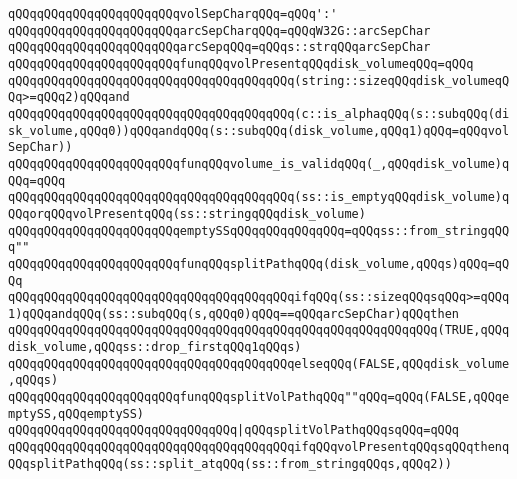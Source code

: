 \verb|qQQqqQQqqQQqqQQqqQQqqQQqvolSepCharqQQq=qQQq':'|\newline
\newline
\verb|qQQqqQQqqQQqqQQqqQQqqQQqarcSepCharqQQq=qQQqW32G::arcSepChar|\newline
\verb|qQQqqQQqqQQqqQQqqQQqqQQqarcSepqQQq=qQQqs::strqQQqarcSepChar|\newline
\newline
\verb|qQQqqQQqqQQqqQQqqQQqqQQqfunqQQqvolPresentqQQqdisk_volumeqQQq=qQQq|\newline
\verb|qQQqqQQqqQQqqQQqqQQqqQQqqQQqqQQqqQQqqQQq(string::sizeqQQqdisk_volumeqQQq>=qQQq2)qQQqand|\newline
\verb|qQQqqQQqqQQqqQQqqQQqqQQqqQQqqQQqqQQqqQQq(c::is_alphaqQQq(s::subqQQq(disk_volume,qQQq0))qQQqandqQQq(s::subqQQq(disk_volume,qQQq1)qQQq=qQQqvolSepChar))|\newline
\newline
\verb|qQQqqQQqqQQqqQQqqQQqqQQqfunqQQqvolume_is_validqQQq(_,qQQqdisk_volume)qQQq=qQQq|\newline
\verb|qQQqqQQqqQQqqQQqqQQqqQQqqQQqqQQqqQQqqQQq(ss::is_emptyqQQqdisk_volume)qQQqorqQQqvolPresentqQQq(ss::stringqQQqdisk_volume)|\newline
\newline
\verb|qQQqqQQqqQQqqQQqqQQqqQQqemptySSqQQqqQQqqQQqqQQq=qQQqss::from_stringqQQq""|\newline
\newline
\verb|qQQqqQQqqQQqqQQqqQQqqQQqfunqQQqsplitPathqQQq(disk_volume,qQQqs)qQQq=qQQq|\newline
\verb|qQQqqQQqqQQqqQQqqQQqqQQqqQQqqQQqqQQqqQQqifqQQq(ss::sizeqQQqsqQQq>=qQQq1)qQQqandqQQq(ss::subqQQq(s,qQQq0)qQQq==qQQqarcSepChar)qQQqthen|\newline
\verb|qQQqqQQqqQQqqQQqqQQqqQQqqQQqqQQqqQQqqQQqqQQqqQQqqQQqqQQqqQQq(TRUE,qQQqdisk_volume,qQQqss::drop_firstqQQq1qQQqs)|\newline
\verb|qQQqqQQqqQQqqQQqqQQqqQQqqQQqqQQqqQQqqQQqelseqQQq(FALSE,qQQqdisk_volume,qQQqs)|\newline
\newline
\verb|qQQqqQQqqQQqqQQqqQQqqQQqfunqQQqsplitVolPathqQQq""qQQq=qQQq(FALSE,qQQqemptySS,qQQqemptySS)|\newline
\verb|qQQqqQQqqQQqqQQqqQQqqQQqqQQqqQQq|\verb#|qQQqsplitVolPathqQQqsqQQq=qQQq#\newline
\verb|qQQqqQQqqQQqqQQqqQQqqQQqqQQqqQQqqQQqqQQqifqQQqvolPresentqQQqsqQQqthenqQQqsplitPathqQQq(ss::split_atqQQq(ss::from_stringqQQqs,qQQq2))|\newline
